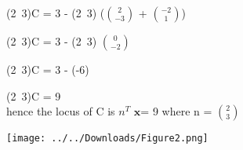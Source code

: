 \documentclass{beamer}
\begin{document}
\begin{frame}
 

(2\ 3)C = 3 - (2\ 3) ($\binom{2}{-3}$  +  $\binom{-2}{1}$)  

(2\ 3)C = 3 - (2\ 3) $\binom{0}{-2}$

(2\ 3)C = 3 - (-6)

(2\ 3)C = 9\\



hence the locus of C is
$n^T$
 $\boldsymbol{x}$= 9
where n = $\binom{2}{3}$

\end{frame}

\begin{frame}

\texttt{[image: ../../Downloads/Figure2.png]} 
\end{frame}
\end{document}
